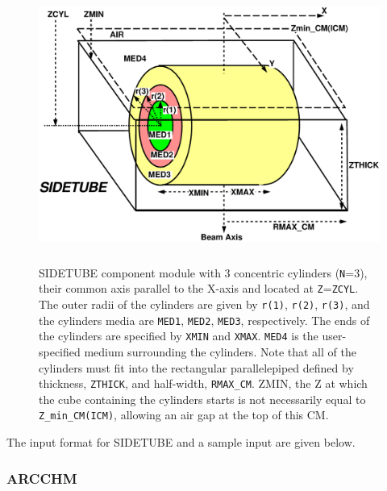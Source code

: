 \documentclass[12pt,twoside]{article}
\begin{document}
\begin{figure}[htbp]
\begin{center}
\leavevmode
\mbox{}\hspace{0cm}
\includegraphics[height=9cm]{figures/sidetubed}
\end{center}
\caption[SIDETUBE CM geometry.]
{SIDETUBE component module with 3 concentric cylinders ({\tt N}=3),
their common axis parallel to the X-axis and located at {\tt Z}={\tt ZCYL}.
The outer radii of the cylinders are given by {\tt r(1)}, {\tt r(2)},
{\tt r(3)}, and the
cylinders media are {\tt MED1}, {\tt MED2}, {\tt MED3}, respectively.  The
ends of the cylinders are specified by {\tt XMIN} and {\tt XMAX}.  {\tt MED4} is the user-specified medium surrounding the cylinders.  Note that all of the cylinders must fit
into the rectangular parallelepiped
defined by thickness, {\tt ZTHICK}, and half-width, {\tt RMAX\_CM}.  ZMIN,
the Z at which the cube containing the cylinders starts is not necessarily
equal to {\tt Z\_min\_CM(ICM)}, allowing an air gap at the top of this CM.}
\label{fig_SIDETUBED}
\end{figure}
\clearpage

The input format for SIDETUBE and a sample input are given below.

\begin{small}

\end{small}

\clearpage

\subsubsection{ARCCHM}
\renewcommand{\rightmark}{ARCCHM CM}
\end{document}
